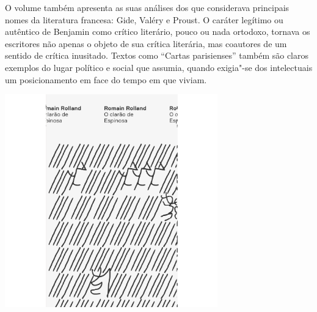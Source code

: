 O volume também apresenta as suas análises dos que considerava principais nomes da literatura francesa: Gide, Valéry e Proust. O caráter legítimo ou autêntico de Benjamin como crítico literário, pouco ou nada ortodoxo, tornava os escritores não apenas o objeto de sua crítica literária, mas coautores de um sentido de crítica inusitado. Textos como “Cartas parisienses” também são claros exemplos do lugar político e social que assumia, quando exigia"-se dos intelectuais um posicionamento em face do tempo em que viviam.

\vfill

\hspace*{-.4cm}\begin{minipage}[c]{.5\linewidth}
\small{
{}}
\end{minipage}

\pagebreak



\hspace{.5cm}

\begin{center}
\hspace*{-2.5cm}
\hspace*{2.5cm}\includegraphics[width=92mm]{./grid/rolland.png}
\end{center}

